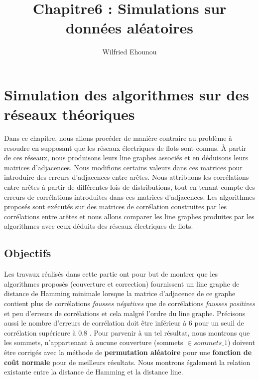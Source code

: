 \documentclass[onecolumn, 12pt]{book}
\title{Chapitre6 : Simulations sur donn\'ees al\'eatoires}
\author{Wilfried Ehounou}
\date{\oldstylenums{\today}}
\begin{document}
\maketitle
\tableofcontents

\chapter{Simulation des algorithmes sur des r\'eseaux th\'eoriques}
Dans ce chapitre, nous allons proc\'eder de mani\`ere contraire au probl\`eme \`a resoudre en supposant que les r\'eseaux \'electriques de flots sont connus. 
\`A partir de ces r\'eseaux, nous produisons leurs line graphes associ\'es et en d\'eduisons leurs matrices d'adjacences. 
Nous modifions certains valeurs dans ces matrices pour introduire des erreurs d'adjacences entre ar\^etes. \newline
Nous attribuons les corr\'elations entre ar\^etes \`a partir de diff\'erentes lois de distributions, tout en tenant compte des erreurs de corr\'elations introduites dans ces matrices d'adjacences. \newline
Les algorithmes propos\'es sont ex\'ecut\'es sur des matrices de corr\'elation construites par les corr\'elations entre ar\^etes et nous allons comparer les line graphes produites par les algorithmes avec ceux d\'eduits des r\'eseaux \'electriques de flots. 


\section{Objectifs}
Les travaux r\'ealis\'es dans cette partie ont pour but de montrer que les algorithmes propos\'es (couverture et correction) fournissent un line graphe de distance de Hamming minimale lorsque la matrice d'adjacence de ce graphe contient plus de corr\'elations {\em fausses n\'egatives} que de corr\'elations {\em fausses positives} et peu d'erreurs de corr\'elations et cela malgr\'e l'ordre du line graphe. Pr\'ecisons aussi le nombre d'erreurs de corr\'elation  doit \^etre inf\'erieur \`a $6$ pour un seuil de corr\'elation sup\'erieure \`a $0.8$ . \newline
Pour parvenir \`a un tel r\'esultat, nous montrons que les sommets, n'appartenant \`a aucune couverture (sommets $\in sommets\_1$) doivent \^etre corrig\'es avec la m\'ethode de {\bf permutation al\'eatoire} pour une {\bf fonction de co\^ut normale} pour de meilleurs r\'esultats.
Nous montrons \'egalement la relation existante entre la distance de Hamming et la distance line.
\end{document}
